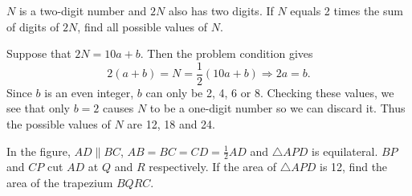 \begin{question}
    $N$ is a two-digit number and $2N$ also has two digits. If $N$ equals 2
    times the sum of digits of $2N$, find all possible values of $N$.
\end{question}
\begin{solution}
    Suppose that $2N = 10a + b$. Then the problem condition gives
    \[ 2(a + b) = N = \frac{1}{2}(10a + b) \Longrightarrow 2a = b. \]
    Since $b$ is an even integer, $b$ can only be 2, 4, 6 or 8. Checking these
    values, we see that only $b = 2$ causes $N$ to be a one-digit number so we
    can discard it. Thus the possible values of $N$ are 12, 18 and 24.
\end{solution}
\begin{question}
    In the figure, $AD \parallel BC$, $AB = BC = CD = \frac{1}{2}AD$ and
    $\triangle APD$ is equilateral. $BP$ and $CP$ cut $AD$ at $Q$ and $R$
    respectively. If the area of $\triangle APD$ is 12, find the area of the
    trapezium $BQRC$.
\end{question}
